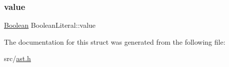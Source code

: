 \subsubsection{\texorpdfstring{value}{value}}
{\footnotesize\ttfamily \hyperlink{struct_boolean}{Boolean} Boolean\+Literal\+::value}



The documentation for this struct was generated from the following file\+:\begin{DoxyCompactItemize}
\item 
src/\hyperlink{ast_8h}{ast.\+h}\end{DoxyCompactItemize}
